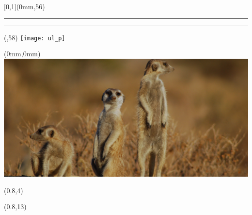\begin{frame}[plain]
  \begin{textblock*}{\paperwidth}[0,1](0mm,56\TPVertModule)
    \textcolor{rouge}{\rule{\banderougewidth}{\banderougeheight}}%
    \textcolor{or}{\rule{\bandeorwidth}{\bandeorheight}}           %
  \end{textblock*}

  \begin{textblock*}{\bandeorwidth}(\banderougewidth,58\TPVertModule)
    \texttt{[image: ul\_p]}
  \end{textblock*}

  \begin{textblock*}{\paperwidth}(0mm,0mm)
    \includegraphics[height=\imageheight,width=\paperwidth]{images/Suricates_Namibia-2-diapos}
  \end{textblock*}

  \begin{textblock*}{\banderougewidth}(0.8\TPHorizModule,4\TPVertModule)
    \textcolor{black!10}{\titlefmt}
  \end{textblock*}

  \begin{textblock*}{\banderougewidth}(0.8\TPHorizModule,13\TPVertModule)
    \textcolor{black!10}{\subtitlefmt}
  \end{textblock*}
\end{frame}


